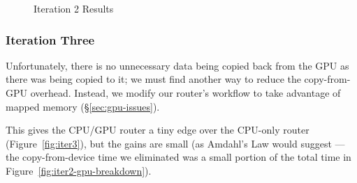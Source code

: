 \begin{figure}
    \centering

	\medskip

   	\medskip

    \caption{Iteration 2 Results}
	\label{fig:iter2}
\end{figure}


\subsubsection{Iteration Three}

Unfortunately, there is no unnecessary data being copied back from the GPU as
there was being copied to it; we must find another way to reduce the
copy-from-GPU overhead. Instead, we modify our router's workflow to take
advantage of mapped memory (\S\ref{sec:gpu-issues}).

This gives the CPU/GPU router a tiny edge over the CPU-only router
(Figure~\ref{fig:iter3}), but the gains are small (as Amdahl's Law would
suggest --- the copy-from-device time we eliminated was a small portion of the
total time in Figure~\ref{fig:iter2-gpu-breakdown}).


